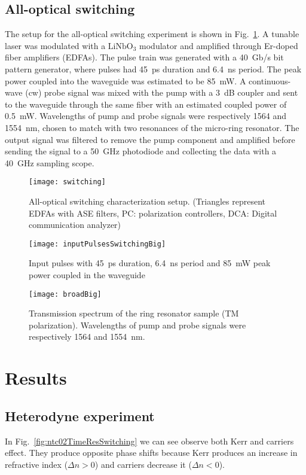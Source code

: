 \subsection{All-optical switching}
The setup for the all-optical switching experiment is shown in Fig.~\ref{fig:switchingSetupSwitching}. A tunable laser was modulated with a $ \mathrm{LiNbO_3} $ modulator and amplified through Er-doped fiber amplifiers (EDFAs). The pulse train was generated with a 40~Gb/s bit pattern generator, where pulses had 45~ps duration and 6.4~ns period. The peak power coupled into the waveguide was estimated to be 85~mW. A continuous-wave (cw) probe signal was mixed with the pump with a 3~dB coupler and sent to the waveguide through the same fiber with an estimated coupled power of 0.5~mW. Wavelengths of pump and probe signals were respectively 1564 and 1554~nm, chosen to match with two resonances of the micro-ring resonator. The output signal was filtered to remove the pump component and amplified before sending the signal to a 50~GHz photodiode and collecting the data with a 40~GHz sampling scope.


\begin{figure}[htb]
    \centering
    \texttt{[image: switching]}
    \caption{All-optical switching characterization setup. (Triangles represent EDFAs with ASE filters, PC: polarization controllers, DCA: Digital communication analyzer)}
    \label{fig:switchingSetupSwitching}
\end{figure}

\begin{figure}[htb]
    \centering
    \texttt{[image: inputPulsesSwitchingBig]}
    \caption{Input pulses with 45~ps duration, 6.4~ns period and 85~mW peak power coupled in the waveguide}
    \label{fig:inputPulsesSwitchingBig}
\end{figure}

\begin{figure}[htb]
    \centering
    \texttt{[image: broadBig]}
    \caption{Transmission spectrum of the ring resonator sample (TM polarization). Wavelengths of pump and probe signals were respectively 1564 and 1554~nm.}
    \label{fig:transmissionSwitching}
\end{figure}

\section{Results}
\subsection{Heterodyne experiment}
In Fig.~\ref{fig:ntc02TimeResSwitching} we can see observe both Kerr and carriers effect. They produce opposite phase shifts because Kerr produces an increase in refractive index ($\Delta n > 0$) and carriers decrease it ($\Delta n < 0$).


